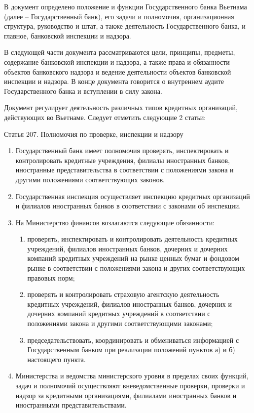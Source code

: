 \documentclass{article}
\begin{document}
В документ \cite{law46} определено положение и функции Государственного банка Вьетнама (далее -- Государственный банк), его задачи и полномочия, организационная структура, руководство и штат, а также деятельность Государственного банка, и главное, банковской инспекции и надзора.

В следующей части документа рассматриваются цели, принципы, предметы, содержание банковской инспекции и надзора, а также права и обязанности объектов банковского надзора и ведение деятельности объектов банковской инспекции и надзора. В конце документа говорится о внутреннем аудите Государственного банка и вступлении в силу закона.

Документ \cite{law47} регулирует деятельность различных типов кредитных организаций, действующих во Вьетнаме. Следует отметить следующие 2 статьи:

Статья 207. Полномочия по проверке, инспекции и надзору

\begin{enumerate}
  \item Государственный банк имеет полномочия проверять, инспектировать и контролировать кредитные учреждения, филиалы иностранных банков, иностранные представительства в соответствии с положениями закона  и другими положениями соответствующих законов.
  \item Государственная инспекция осуществляет инспекцию кредитных организаций и филиалов иностранных банков в соответствии с законами об инспекции.
  \item На Министерство финансов возлагаются следующие обязанности:
  \begin{enumerate}[label=\asbuk*), labelindent=1.47cm]
    \item проверять, инспектировать и контролировать деятельность кредитных учреждений, филиалов иностранных банков, дочерних и дочерних компаний кредитных учреждений на рынке ценных бумаг и фондовом рынке в соответствии с положениями закона  и других соответствующих правовых норм;
    \item проверять и контролировать страховую агентскую деятельность кредитных учреждений, филиалов иностранных банков, дочерних и дочерних компаний кредитных учреждений в соответствии с положениями закона  и другими соответствующими законами;
    \item председательствовать, координировать и обмениваться информацией с Государственным банком при реализации положений пунктов а) и б) настоящего пункта.
  \end{enumerate}
  \item Министерства и ведомства министерского уровня в пределах своих функций, задач и полномочий осуществляют вневедомственные проверки, проверки и надзор за кредитными организациями, филиалами иностранных банков и иностранными представительствами.
\end{enumerate}
\end{document}
